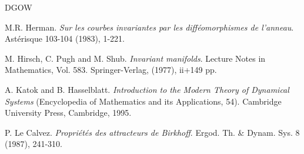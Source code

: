 \documentclass{amsart}
\begin{document}
\begin{thebibliography}{DGOW}
			
			 M.R. Herman. {\it Sur les courbes invariantes par les diff\'{e}omorphismes de l'anneau}. Ast\'{e}risque {103-104} (1983), 1-221.
			
			
			
			
			
			
			 M. Hirsch, C. Pugh and M. Shub. {\it Invariant manifolds}. Lecture Notes in Mathematics, Vol. 583. Springer-Verlag, (1977), ii+149 pp.
			
			
			
			
			 A. Katok and B. Hasselblatt. {\it Introduction to the Modern Theory of Dynamical Systems} (Encyclopedia of Mathematics and its Applications, 54). Cambridge University Press, Cambridge, 1995.
			
			
			
			 P.  Le Calvez. {\it Propri\'{e}t\'{e}s des attracteurs de Birkhoff}.
			Ergod. Th. \& Dynam. Sys. {8} (1987), 241-310.
			
			
			

\end{thebibliography}
\end{document}

